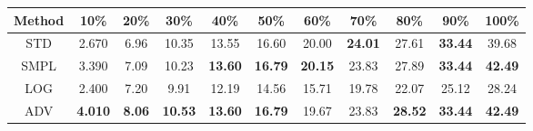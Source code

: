 \documentclass{standalone}
\begin{document}
\begin{tabular}{c|cccccccccc}
      \toprule
      Method & 10\% & 20\% & 30\% & 40\% & 50\% & 60\% & 70\% & 80\% & 90\% & 100\% \\
      \midrule
STD & 2.670 & 6.96 & 10.35 & 13.55 & 16.60 & 20.00 & \textbf{24.01} & 27.61 & \textbf{33.44} & 39.68\\
SMPL & 3.390 & 7.09 & 10.23 & \textbf{13.60} & \textbf{16.79} & \textbf{20.15} & 23.83 & 27.89 & \textbf{33.44} & \textbf{42.49}\\
LOG & 2.400 & 7.20 & 9.91 & 12.19 & 14.56 & 15.71 & 19.78 & 22.07 & 25.12 & 28.24\\
ADV & \textbf{4.010} & \textbf{8.06} & \textbf{10.53} & \textbf{13.60} & \textbf{16.79} & 19.67 & 23.83 & \textbf{28.52} & \textbf{33.44} & \textbf{42.49}\\
  \bottomrule
\end{tabular}
\end{document}
